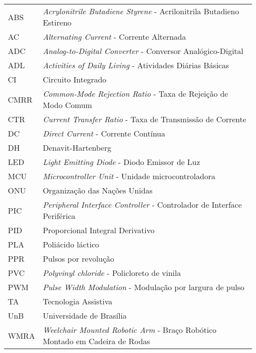\begin{tabular}{p{}p{}}
ABS     & \textit{Acrylonitrile Butadiene Styrene} - Acrilonitrila Butadieno Estireno           \tabularnewline   
AC      & \textit{Alternating Current} - Corrente Alternada                                     \tabularnewline
ADC     & \textit{Analog-to-Digital Converter} - Conversor Analógico-Digital                    \tabularnewline
ADL     & \textit{Activities of Daily Living} - Atividades Diárias Básicas                      \tabularnewline
CI      & Circuito Integrado                                                                    \tabularnewline
CMRR    & \textit{Common-Mode Rejection Ratio} - Taxa de Rejeição de Modo Comum                 \tabularnewline
CTR     & \textit{Current Transfer Ratio} - Taxa de Transmissão de Corrente                     \tabularnewline
DC      & \textit{Direct Current} - Corrente Contínua                                           \tabularnewline
DH      & Denavit-Hartenberg                                                                    \tabularnewline
LED     & \textit{Light Emitting Diode} - Diodo Emissor de Luz                                  \tabularnewline
MCU     & \textit{Microcontroller Unit} - Unidade microcontroladora                             \tabularnewline
ONU     & Organização das Nações Unidas                                                         \tabularnewline
PIC     & \textit{Peripheral Interface Controller} - Controlador de Interface Periférica        \tabularnewline
PID     & Proporcional Integral Derivativo                                                      \tabularnewline
PLA     & Poliácido láctico                                                                     \tabularnewline
PPR     & Pulsos por revolução                                                                  \tabularnewline
PVC     & \textit{Polyvinyl chloride} - Policloreto de vinila                                   \tabularnewline
PWM     & \textit{Pulse Width Modulation} - Modulação por largura de pulso                      \tabularnewline
TA      & Tecnologia Assistiva                                                                  \tabularnewline
UnB     & Universidade de Brasília                                                              \tabularnewline
WMRA    & \textit{Weelchair Mounted Robotic Arm} - Braço Robótico Montado em Cadeira de Rodas   \tabularnewline
\end{tabular}
